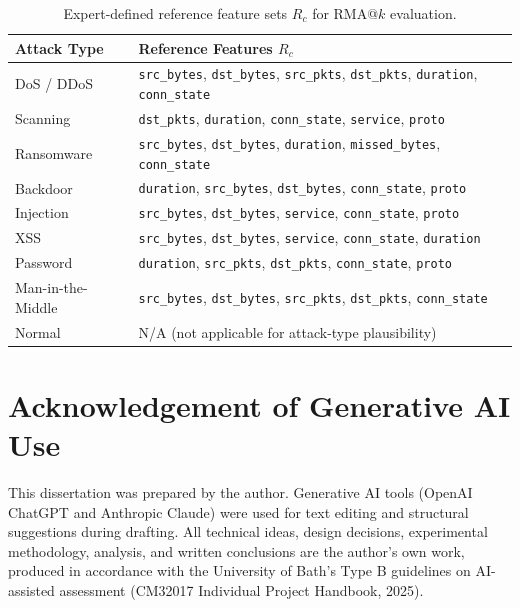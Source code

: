 \documentclass[12pt,a4paper]{report}
\begin{document}
\begin{table}[H]
\centering
\caption{Expert-defined reference feature sets $R_c$ for RMA@$k$ evaluation.}
\label{tab:reference}
\begin{tabular}{lp{8cm}}
\toprule
\textbf{Attack Type} & \textbf{Reference Features $R_c$} \\
\midrule
DoS / DDoS & \texttt{src\_bytes}, \texttt{dst\_bytes}, \texttt{src\_pkts}, \texttt{dst\_pkts}, \texttt{duration}, \texttt{conn\_state} \\
Scanning & \texttt{dst\_pkts}, \texttt{duration}, \texttt{conn\_state}, \texttt{service}, \texttt{proto} \\
Ransomware & \texttt{src\_bytes}, \texttt{dst\_bytes}, \texttt{duration}, \texttt{missed\_bytes}, \texttt{conn\_state} \\
Backdoor & \texttt{duration}, \texttt{src\_bytes}, \texttt{dst\_bytes}, \texttt{conn\_state}, \texttt{proto} \\
Injection & \texttt{src\_bytes}, \texttt{dst\_bytes}, \texttt{service}, \texttt{conn\_state}, \texttt{proto} \\
XSS & \texttt{src\_bytes}, \texttt{dst\_bytes}, \texttt{service}, \texttt{conn\_state}, \texttt{duration} \\
Password & \texttt{duration}, \texttt{src\_pkts}, \texttt{dst\_pkts}, \texttt{conn\_state}, \texttt{proto} \\
Man-in-the-Middle & \texttt{src\_bytes}, \texttt{dst\_bytes}, \texttt{src\_pkts}, \texttt{dst\_pkts}, \texttt{conn\_state} \\
Normal & N/A (not applicable for attack-type plausibility) \\
\bottomrule
\end{tabular}
\end{table}

\chapter{Acknowledgement of Generative AI Use}
\label{app:ai}

This dissertation was prepared by the author. Generative AI tools (OpenAI ChatGPT and Anthropic Claude) were used for text editing and structural suggestions during drafting. All technical ideas, design decisions, experimental methodology, analysis, and written conclusions are the author's own work, produced in accordance with the University of Bath's Type B guidelines on AI-assisted assessment (CM32017 Individual Project Handbook, 2025).
\end{document}
